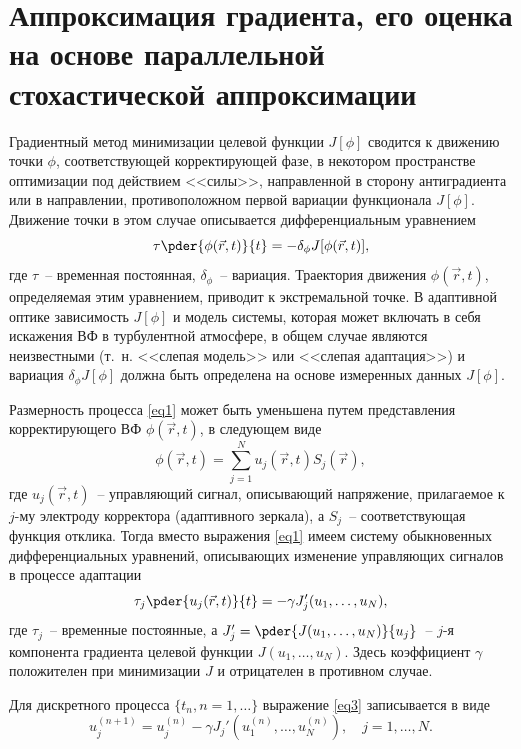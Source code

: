 \documentclass[pscyr,titlepage]{hedreport}
\newcommand{\de}{\delta}
\newcommand{\eq}[1]{\eqref{eq#1}}
\begin{document}
\section{Аппроксимация градиента, его оценка на основе параллельной
стохастической аппроксимации}

Градиентный метод минимизации целевой функции \( J[\phi] \) сводится к движению
точки \( \phi \), соответствующей корректирующей фазе, в некотором пространстве
оптимизации под действием <<силы>>, направленной в сторону антиградиента или в
направлении, противоположном  первой  вариации  функционала \( J[\phi] \).
Движение точки в этом случае описывается дифференциальным уравнением
\begin{equation}
  \tau\pder{\phi(\vec{r}, t)}{t} = -\de_\phi J[\phi(\vec{r}, t)],
  \label{eq1}
\end{equation}
где \( \tau \)~-- временная постоянная, \( \de_\phi \)~-- вариация.
Траектория движения \( \phi(\vec{r}, t) \), определяемая этим уравнением,
приводит к экстремальной точке. В адаптивной оптике зависимость \( J[\phi] \) и
модель системы, которая может включать в себя искажения ВФ в турбулентной
атмосфере, в общем случае являются неизвестными (т.~н. <<слепая модель>> или
<<слепая адаптация>>) и вариация \( \de_\phi J[\phi] \) должна быть
определена на основе измеренных данных \( J[\phi] \).

Размерность процесса \eq{1} может быть уменьшена путем представления
корректирующего ВФ \( \phi(\vec{r}, t) \), в следующем виде
\[
  \phi(\vec{r}, t) = \sum_{j = 1}^N u_j(\vec{r}, t) S_j(\vec{r}),
\]
где \( u_j(\vec{r}, t) \)~-- управляющий сигнал, описывающий напряжение,
прилагаемое к \( j \)-му электроду корректора (адаптивного зеркала), а
\( S_j \)~-- соответствующая функция отклика. Тогда вместо выражения \eq{1}
имеем систему обыкновенных дифференциальных уравнений, описывающих изменение
управляющих сигналов в процессе адаптации
\begin{equation}
  \tau_j \pder{u_j(\vec{r}, t)}{t} = -\gamma J_j'(u_1, \ldots, u_N),
  \label{eq3}
\end{equation}
где \( \tau_j \)~-- временные постоянные, а
\( J_j' = \pder{J(u_1, \ldots, u_N)}{u_j} \)~-- \( j \)-я компонента градиента
целевой функции \( J(u_1, \ldots, u_N) \). Здесь коэффициент \( \gamma \)
положителен при минимизации \( J \) и отрицателен в противном случае.

Для дискретного процесса \( \{ t_n, n=1,\ldots \} \) выражение \eq{3}
записывается в виде
\begin{equation}
  u_j^{(n+1)} = u_j^{(n)} - \gamma J_j'(u_1^(n), \ldots, u_N^{(n)}), \quad
    j = 1, \ldots, N.
  \label{eq5}
\end{equation}
\end{document}
